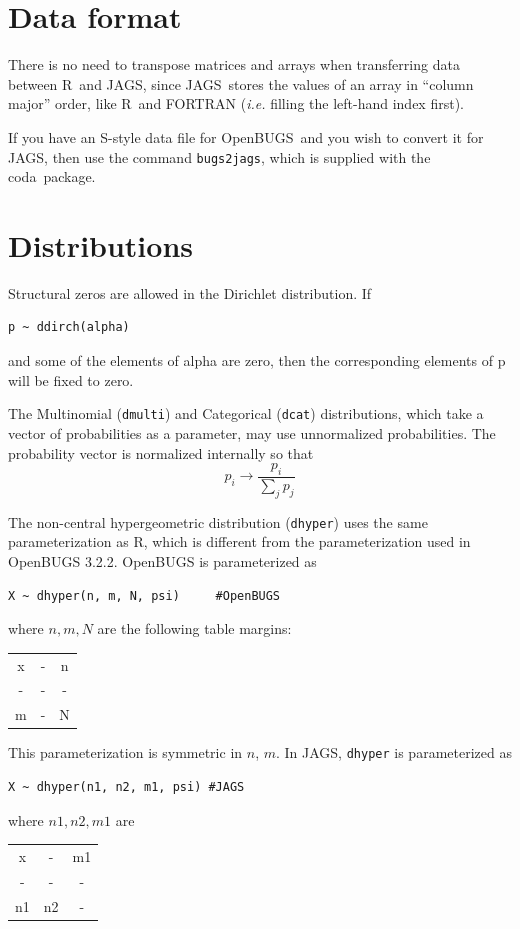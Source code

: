 \documentclass[11pt, a4paper, titlepage]{report}
\newcommand{\JAGS}{\textsf{JAGS}}
\newcommand{\OpenBUGS}{\textsf{OpenBUGS}}
\newcommand{\R}{\textsf{R}}
\newcommand{\CODA}{\textsf{coda}}
\begin{document}
\section{Data format}

There is no need to transpose matrices and arrays when transferring
data between \R\ and \JAGS, since \JAGS\ stores the values of an array
in ``column major'' order, like \R\ and FORTRAN ({\em i.e.} filling
the left-hand index first).

If you have an \textsf{S}-style data file for \OpenBUGS\ and you wish
to convert it for \JAGS, then use the command \texttt{bugs2jags},
which is supplied with the \CODA\ package.

\section{Distributions}

Structural zeros are allowed in the Dirichlet distribution. If
\begin{verbatim}
p ~ ddirch(alpha)
\end{verbatim}
and some of the elements of alpha are zero, then the corresponding
elements of p will be fixed to zero.

The Multinomial (\verb+dmulti+) and Categorical (\verb+dcat+)
distributions, which take a vector of probabilities as a parameter,
may use unnormalized probabilities. The probability vector is
normalized internally so that
\[
p_i \rightarrow \frac{p_i}{\sum_j p_j}
\]

The non-central hypergeometric distribution (\verb+dhyper+) uses the
same parameterization as \R, which is different from the
parameterization used in OpenBUGS 3.2.2. OpenBUGS is parameterized as
\begin{verbatim}
X ~ dhyper(n, m, N, psi)     #OpenBUGS
\end{verbatim}
where $n, m, N$ are the following table margins:
\begin{center}
\begin{tabular}{|cc|c|}
\hline
x & - & n \\
-  & - & -  \\
\hline
m & - & N \\
\hline
\end{tabular}
\end{center}
This parameterization is symmetric in $n$, $m$. In JAGS, \verb+dhyper+
is parameterized as
\begin{verbatim}
X ~ dhyper(n1, n2, m1, psi) #JAGS 
\end{verbatim}
where $n1, n2, m1$ are
\begin{center}
\begin{tabular}{|cc|c|}
\hline
x & - & m1 \\
-  & - & -   \\
\hline
n1 & n2 & - \\
\hline
\end{tabular}
\end{center}
\end{document}
